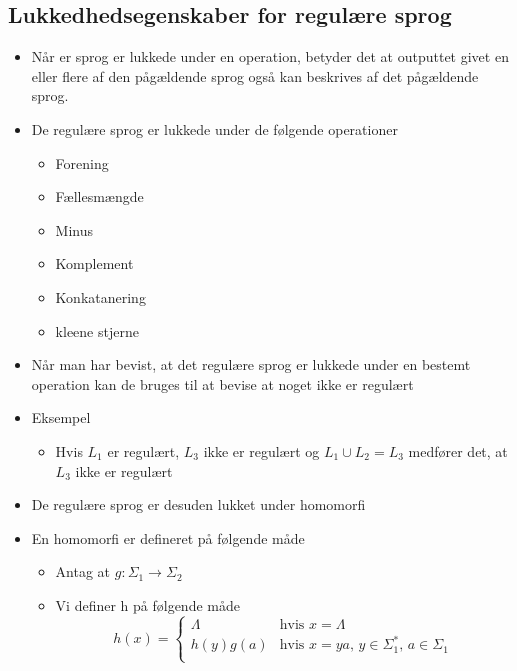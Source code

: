 \documentclass[a4, danish]{article}
\begin{document}
\subsection{Lukkedhedsegenskaber for regulære sprog}
\begin{itemize}
  \item Når er sprog er lukkede under en operation, betyder det at outputtet givet en eller flere af den pågældende sprog også kan beskrives af det pågældende sprog.
  \item De regulære sprog er lukkede under de følgende operationer
  \begin{itemize}
    \item Forening
    \item Fællesmængde
    \item Minus
    \item Komplement
    \item Konkatanering
    \item kleene stjerne
  \end{itemize}
  \item Når man har bevist, at det regulære sprog er lukkede under en bestemt operation kan de bruges til at bevise at noget ikke er regulært
  \item Eksempel
  \begin{itemize}
    \item Hvis $L_1$ er regulært, $L_3$ ikke er regulært og $L_1 \cup L_2 = L_3$ medfører det, at $L_3$ ikke er regulært 
  \end{itemize}
  \item De regulære sprog er desuden lukket under homomorfi
  \item En homomorfi er defineret på følgende måde
  \begin{itemize}
    \item Antag at $g: \Sigma_1 \rightarrow \Sigma_2$
    \item Vi definer h på følgende måde
 	 	\begin{equation*}
		h(x) =
		\begin{cases}
			\mbox{$\Lambda$} & \mbox{hvis $x = \Lambda$} \\
			\mbox{$h(y)g(a)$} & \mbox{hvis $x=ya$, $y \in \Sigma_1^*$, $a \in \Sigma_1$} \\
		\end{cases}
		\end{equation*}    
  \end{itemize}
\end{itemize}
\end{document}
